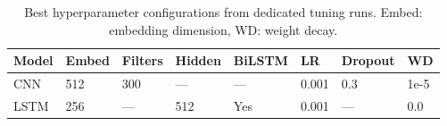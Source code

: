 \begin{table}[h]
\centering
\small
\begin{tabular}{llllllll}
\toprule
\textbf{Model} & \textbf{Embed} & \textbf{Filters} & \textbf{Hidden} & \textbf{BiLSTM} & \textbf{LR} & \textbf{Dropout} & \textbf{WD} \\
\midrule
CNN & 512 & 300 & --- & --- & 0.001 & 0.3 & 1e-5 \\
LSTM & 256 & --- & 512 & Yes & 0.001 & --- & 0.0 \\
\bottomrule
\end{tabular}
\caption{Best hyperparameter configurations from dedicated tuning runs. Embed: embedding dimension, WD: weight decay.}

\label{tab:best_configs}
\end{table}
